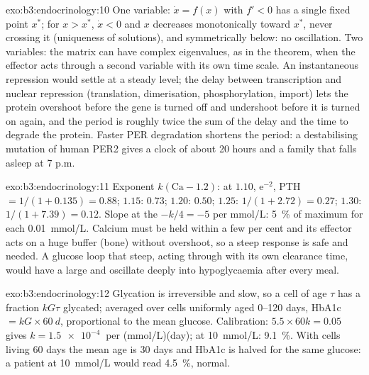 \begin{solution}{exo:b3:endocrinology:10}
One variable: $\dot x = f(x)$ with $f' < 0$ has a single fixed point
$x^{*}$; for $x > x^{*}$, $\dot x < 0$ and $x$ decreases monotonically
toward $x^{*}$, never crossing it (uniqueness of solutions), and
symmetrically below: no oscillation. Two variables: the matrix can have
complex eigenvalues, as in the theorem, when the effector acts through
a second variable with its own time scale. An instantaneous repression
would settle at a steady level; the delay between transcription and
nuclear repression (translation, dimerisation, phosphorylation, import)
lets the protein overshoot before the gene is turned off and undershoot
before it is turned on again, and the period is roughly twice the sum
of the delay and the time to degrade the protein. Faster PER degradation
shortens the period: a destabilising mutation of human PER2 gives a
clock of about 20 hours and a family that falls asleep at 7 p.m.
\end{solution}

\begin{solution}{exo:b3:endocrinology:11}
Exponent $k(\text{Ca} - 1.2)$: at $1.10$, $\mathrm{e}^{-2}$, PTH $= 1/
(1 + 0.135) = 0.88$; $1.15$: $0.73$; $1.20$: $0.50$; $1.25$: $1/(1 +
2.72) = 0.27$; $1.30$: $1/(1 + 7.39) = 0.12$. Slope at the 
$-k/4 = -5$ per mmol/L: \qty{5}{\%} of maximum for each
\qty{0.01}{mmol/L}. Calcium must be held within a few per cent and its
effector acts on a huge buffer (bone) without overshoot, so a steep
response is safe and needed. A glucose loop that steep, acting through
 with its own clearance time, would have a large  and
oscillate deeply into hypoglycaemia after every meal.
\end{solution}

\begin{solution}{exo:b3:endocrinology:12}
Glycation is irreversible and slow, so a cell of age $\tau$ has a
fraction $kG\tau$ glycated; averaged over cells uniformly aged
\numrange{0}{120} days, HbA1c $= kG\times\qty{60}{d}$, proportional
to the mean glucose. Calibration: $5.5\times 60k = 0.05$ gives $k =
\qty{1.5e-4}{}$ per (mmol/L)(day); at \qty{10}{mmol/L}: \qty{9.1}{\%}.
With cells living 60 days the mean age is 30 days and HbA1c is
halved for the same glucose: a patient at \qty{10}{mmol/L} would read
\qty{4.5}{\%}, normal.
\end{solution}

